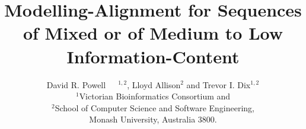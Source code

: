 \documentclass[letterpaper,11pt,oneside]{article}
\begin{document}
\title{ Modelling-Alignment for Sequences of Mixed or
of Medium to Low Information-Content }

\author{
  David R. Powell\footnotemark[1]~\footnotemark[2]~~$^{1,2}$, Lloyd Allison$^2$ and Trevor I. Dix$^{1,2}$ \\
  $^1$Victorian Bioinformatics Consortium and \\
  $^2$School of Computer Science and Software Engineering, \\
  Monash University, Australia 3800.
}

\renewcommand{\thefootnote}{\fnsymbol{footnote}}
\renewcommand{\thefootnote}{\arabic{footnote}}

\date{}
\maketitle

\end{document}
